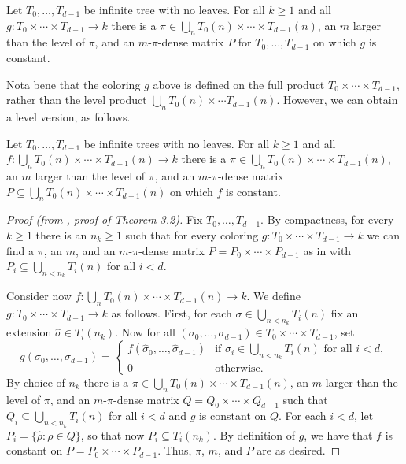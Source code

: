 
\begin{lemma}\label{lem:HLuneven}
	Let $T_0,\ldots,T_{d-1}$ be infinite tree with no leaves. For all $k \geq 1$ and all $g:T_0 \times \cdots \times T_{d-1} \to k$ there is a $\pi \in \bigcup_n T_0(n) \times \cdots \times T_{d-1}(n)$, an $m$ larger than the level of $\pi$, and an $m$-$\pi$-dense matrix $P$ for $T_0,\ldots,T_{d-1}$ on which $g$ is constant.
\end{lemma}

\noindent Nota bene that the coloring $g$ above is defined on the full product $T_0 \times \cdots \times T_{d-1}$, rather than the level product $\bigcup_{n} T_0(n) \times \cdots T_{d-1}(n)$. However, we can obtain a level version, as follows.

\begin{lemma}\label{lem:HLlevel}
	Let $T_0,\ldots,T_{d-1}$ be infinite trees with no leaves. For all $k \geq 1$ and all $f: \bigcup_{n} T_0(n) \times \cdots \times T_{d-1}(n) \to k$ there is a $\pi \in \bigcup_n T_0(n) \times \cdots \times T_{d-1}(n)$, an $m$ larger than the level of $\pi$, and an $m$-$\pi$-dense matrix $P \subseteq \bigcup_{n} T_0(n) \times \cdots \times T_{d-1}(n)$ on which $f$ is constant.
\end{lemma}

\begin{proof}[Proof (from \cite{Todorcevic2010Ramsey}, proof of Theorem 3.2)]
	Fix $T_0,\ldots,T_{d-1}$. By compactness, for every $k \geq 1$ there is an $n_k \geq 1$ such that for every coloring $g:T_0 \times \cdots \times T_{d-1} \to k$ we can find a $\pi$, an $m$, and an $m$-$\pi$-dense matrix $P = P_0 \times \cdots \times P_{d-1}$ as in  with $P_i \subseteq \bigcup_{n < n_k} T_i(n)$ for all $i < d$.

	Consider now $f: \bigcup_{n} T_0(n) \times \cdots \times T_{d-1}(n) \to k$. We define $g: T_0 \times \cdots \times T_{d-1} \to k$ as follows. First, for each $\sigma \in \bigcup_{n < n_k} T_i(n)$ fix an extension $\hat{\sigma} \in T_i(n_k)$. Now for all $(\sigma_0,\ldots,\sigma_{d-1}) \in T_0 \times \cdots \times T_{d-1}$, set
	\[
		g(\sigma_0,\ldots,\sigma_{d-1}) =
		\begin{cases}
			f(\hat{\sigma}_0,\ldots,\hat{\sigma}_{d-1}) & \text{if } \sigma_i \in \bigcup_{n < n_k} T_i(n) \text{ for all } i < d,\\
			0 & \text{otherwise.}
		\end{cases}
	\]
	By choice of $n_k$ there is a $\pi \in \bigcup_n T_0(n) \times \cdots \times T_{d-1}(n)$, an $m$ larger than the level of $\pi$, and an $m$-$\pi$-dense matrix $Q = Q_0 \times \cdots \times Q_{d-1}$ such that $Q_i \subseteq \bigcup_{n < n_k} T_i(n)$ for all $i < d$ and $g$ is constant on $Q$. For each $i < d$, let $P_i = \{\hat{\rho}: \rho \in Q\}$, so that now $P_i \subseteq T_i(n_k)$. By definition of $g$, we have that $f$ is constant on $P = P_0 \times \cdots \times P_{d-1}$. Thus, $\pi$, $m$, and $P$ are as desired.
\end{proof}

